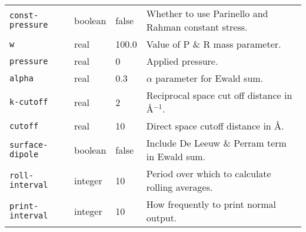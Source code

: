 \begin{table}
\begin{minipage}{\textwidth}
\begin{tabular}{|l|l|l|p{2.7in}|}
\verb'const-pressure' &  	boolean & 		false  &
Whether to use Parinello and Rahman constant stress. \\
\verb'w' &		    	real &			100.0 &
Value of P \& R mass parameter. \\
\verb'pressure' &	    	real &			0 &
Applied pressure. \\ \hline
\verb'alpha' &	    		real &			0.3 &
$\alpha$ parameter for Ewald sum. \\
\verb'k-cutoff' &		real &			2 &
Reciprocal space cut off distance in \AA$^{-1}$. \\
\verb'cutoff' &	    	real &			10 &
Direct space cutoff distance in \AA. \\
\verb'surface-dipole' &	boolean & 		false  &
Include De Leeuw \& Perram term in Ewald sum. \\ \hline
\verb'roll-interval' &   	integer & 		10 &
Period over which to calculate rolling averages. \\
\verb'print-interval' &  	integer & 		10 &
How frequently to print normal output. \\ \hline
\end{tabular}
\end{minipage}
\end{table}
